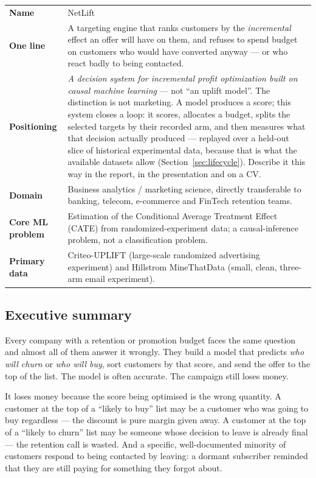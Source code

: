 \documentclass[11pt,a4paper]{article}
\begin{document}
\begin{tabularx}{\textwidth}{@{}L{3.4cm}X@{}}
\toprule
\textbf{Name} & NetLift \\
\textbf{One line} & A targeting engine that ranks customers by the \emph{incremental} effect
an offer will have on them, and refuses to spend budget on customers who would have converted
anyway --- or who react badly to being contacted. \\
\textbf{Positioning} & \emph{A decision system for incremental profit optimization built on causal
machine learning} --- not ``an uplift model''. The distinction is not marketing. A model produces a
score; this system closes a loop: it scores, allocates a budget, splits the selected targets by
their recorded arm, and then measures what that decision actually produced --- replayed over a
held-out slice of historical experimental data, because that is what the available datasets allow
(Section~\ref{sec:lifecycle}). Describe it this way in the report, in the presentation and on a CV. \\
\textbf{Domain} & Business analytics / marketing science, directly transferable to banking,
telecom, e-commerce and FinTech retention teams. \\
\textbf{Core ML problem} & Estimation of the Conditional Average Treatment Effect (CATE) from
randomized-experiment data; a causal-inference problem, not a classification problem. \\
\textbf{Primary data} & Criteo-UPLIFT (large-scale randomized advertising experiment) and
Hillstrom MineThatData (small, clean, three-arm email experiment). \\
\bottomrule
\end{tabularx}

\subsection{Executive summary}

Every company with a retention or promotion budget faces the same question and almost all of
them answer it wrongly. They build a model that predicts \emph{who will churn} or \emph{who will
buy}, sort customers by that score, and send the offer to the top of the list. The model is
often accurate. The campaign still loses money.

It loses money because the score being optimised is the wrong quantity. A customer at the top of
a ``likely to buy'' list may be a customer who was going to buy regardless --- the discount is
pure margin given away. A customer at the top of a ``likely to churn'' list may be someone whose
decision to leave is already final --- the retention call is wasted. And a specific, well-documented
minority of customers respond to being contacted by leaving: a dormant subscriber reminded that
they are still paying for something they forgot about.
\end{document}
